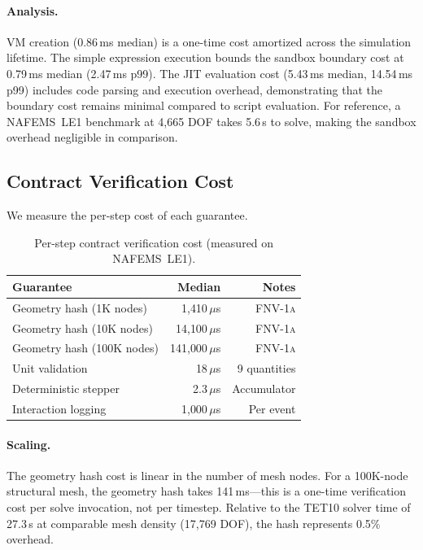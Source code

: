 \documentclass[letterpaper,twocolumn,10pt]{article}
\providecommand{\measuredFrom}[1]{}
\newcommand{\fnvhash}{\textsc{FNV-1a}}
\begin{document}
\paragraph{Analysis.} VM creation (0.86\,ms median) is a one-time cost
amortized across the simulation lifetime. The simple expression execution bounds
the sandbox boundary cost at 0.79\,ms median (2.47\,ms p99). The JIT evaluation cost 
(5.43\,ms median, 14.54\,ms p99) includes code parsing and execution overhead, 
demonstrating that the boundary cost remains minimal compared to script evaluation. For
reference, a NAFEMS~LE1 benchmark at 4{,}665 DOF takes 5.6\,s to solve,
making the sandbox overhead negligible in comparison.

\subsection{Contract Verification Cost}

We measure the per-step cost of each guarantee.

\begin{table}[t]
\centering
\caption{Per-step contract verification cost (measured on NAFEMS~LE1).}
\label{tab:contract-cost}
\small
\measuredFrom{HoloScript/packages/core/src/plugins/__tests__/paper-4-sandbox-bench.test.ts}%
\measuredFrom{HoloScript/packages/engine/src/simulation/__tests__/NAFEMS-LE1.test.ts}%
\measuredFrom{HoloScript/.bench-logs/2026-04-18T07-20-56-134Z/contract-overhead.log}%
\begin{tabular}{@{}lrr@{}}
\toprule
\textbf{Guarantee} & \textbf{Median} & \textbf{Notes} \\
\midrule
Geometry hash (1K nodes)   & 1{,}410\,$\mu$s & \fnvhash{} \\
Geometry hash (10K nodes)  & 14{,}100\,$\mu$s & \fnvhash{} \\
Geometry hash (100K nodes) & 141{,}000\,$\mu$s & \fnvhash{} \\
Unit validation            & 18\,$\mu$s & 9 quantities \\
Deterministic stepper      & 2.3\,$\mu$s & Accumulator \\
Interaction logging        & 1{,}000\,$\mu$s & Per event \\
\bottomrule
\end{tabular}
\end{table}

\paragraph{Scaling.} The geometry hash cost is linear in the number
of mesh nodes. For a 100K-node structural mesh, the geometry hash takes
141\,ms---this is a one-time verification cost per solve invocation, not
per timestep. Relative to the TET10 solver time of 27.3\,s at comparable
mesh density (17{,}769 DOF), the hash represents 0.5\% overhead.
\end{document}
